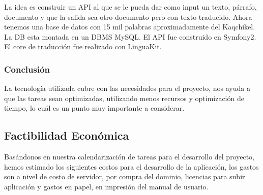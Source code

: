 \documentclass[a4paper,openright,11pt]{article}
\begin{document}
La idea es construir un API al que se le pueda dar como input un texto, p\'arrafo, documento y que la salida sea otro documento pero con texto traducido. Ahora tenemos una base de datos con 15 mil palabras aproximadamente del Kaqchikel. La DB esta montada en un DBMS MySQL. El API fue construido en Symfony2. El core de traducci\'on fue realizado con LinguaKit.

\subsubsection{Conclusión}
La tecnología utilizada cubre con las necesidades para el proyecto, nos ayuda a que las tareas sean optimizadas, utilizando menos recursos y optimización de tiempo, lo cuál es un punto muy importante a considerar.

\subsection{Factibilidad Econ\'omica}
Bas\'andonos en nuestra calendarizaci\'on de tareas para el desarrollo del proyecto, hemos estimado los siguientes costos para el desarrollo de la aplicaci\'on, los gastos son a nivel de costo de servidor, por compra del dominio, licencias para subir aplicaci\'on y gastos en papel, en impresi\'on del manual de usuario.\\
\end{document}
